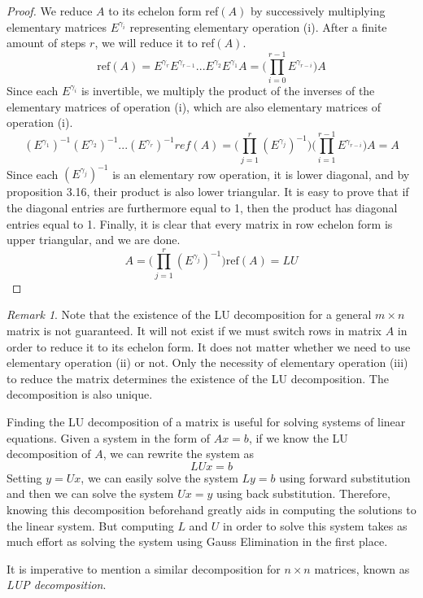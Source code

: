 \documentclass{article}
\theoremstyle{remark}
\newtheorem*{remark}{Remark}
\theoremstyle{definition}
\begin{document}
\begin{proof}
We reduce $A$ to its echelon form ref$(A)$ by successively multiplying elementary matrices $E^{\gamma_i}$ representing elementary operation (i). After a finite amount of steps $r$, we will reduce it to ref$(A)$.
\[ \text{ref}(A) = E^{\gamma_r} E^{\gamma_{r-1}} ... E^{\gamma_2} E^{\gamma_1} A = \bigg(\prod_{i = 0}^{r-1} E^{\gamma_{r-i}}\bigg) A\]
Since each $E^{\gamma_i}$ is invertible, we multiply the product of the inverses of the elementary matrices of operation (i), which are also elementary matrices of operation (i). 
\[ (E^{\gamma_1})^{-1} (E^{\gamma_2})^{-1} ... (E^{\gamma_r})^{-1} ref(A) = \bigg( \prod_{j = 1}^r (E^{\gamma_j})^{-1} \bigg) \bigg( \prod_{i=1}^{r-1} E^{\gamma_{r-i}} \bigg) A = A \]
Since each $(E^{\gamma_j})^{-1}$ is an elementary row operation, it is lower diagonal, and by proposition 3.16, their product is also lower triangular. It is easy to prove that if the diagonal entries are furthermore equal to 1, then the product has diagonal entries equal to 1. Finally, it is clear that every matrix in row echelon form is upper triangular, and we are done. 
\[ A = \bigg( \prod_{j = 1}^r (E^{\gamma_j})^{-1} \bigg) \text{ref}(A) = L U\]
\end{proof}

\begin{remark}
Note that the existence of the LU decomposition for a general $m \times n$ matrix is not guaranteed. It will not exist if we must switch rows in matrix $A$ in order to reduce it to its echelon form. It does not matter whether we need to use elementary operation (ii) or not. Only the necessity of elementary operation (iii) to reduce the matrix determines the existence of the LU decomposition. The decomposition is also unique. 
\end{remark}

Finding the LU decomposition of a matrix is useful for solving systems of linear equations. Given a system in the form of $A x = b$, if we know the LU decomposition of $A$, we can rewrite the system as 
\[ L U x = b\]
Setting $y = U x$, we can easily solve the system $L y = b$ using forward substitution and then we can solve the system $U x = y$ using back substitution. Therefore, knowing this decomposition beforehand greatly aids in computing the solutions to the linear system. But computing $L$ and $U$ in order to solve this system takes as much effort as solving the system using Gauss Elimination in the first place. 

It is imperative to mention a similar decomposition for $n \times n$ matrices, known as \textit{LUP decomposition}. 
\end{document}
